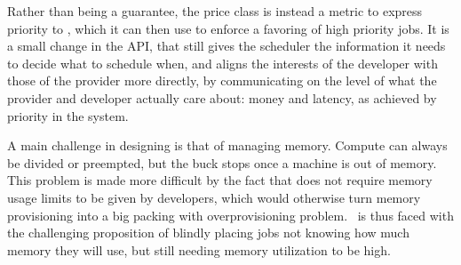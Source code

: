 Rather than being a guarantee, the price class is instead a metric to express
priority to \sys{}, which it can then use to enforce a favoring of high priority
jobs. It is a small change in the API, that still gives the scheduler the
information it needs to decide what to schedule when, and aligns the interests
of the developer with those of the provider more directly, by communicating on
the level of what the provider and developer actually care about: money and
latency, as achieved by priority in the system.

A main challenge in designing \sys{} is that of managing memory. Compute can
always be divided or preempted, but the buck stops once a machine is out of
memory. This problem is made more difficult by the fact that \sys{} does not
require memory usage limits to be given by developers, which would otherwise
turn memory provisioning into a big packing with overprovisioning
problem.~\Sys{} is thus faced with the challenging proposition of blindly
placing jobs not knowing how much memory they will use, but still needing memory
utilization to be high.


 
